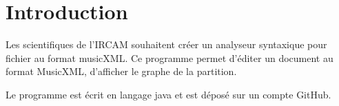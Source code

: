 \section*{Introduction}

Les scientifiques de l'IRCAM souhaitent créer un analyseur syntaxique pour fichier au format musicXML. Ce programme permet d'éditer un document au format MusicXML, d'afficher le graphe de la partition.

Le programme est écrit en langage java et est déposé sur un compte GitHub.